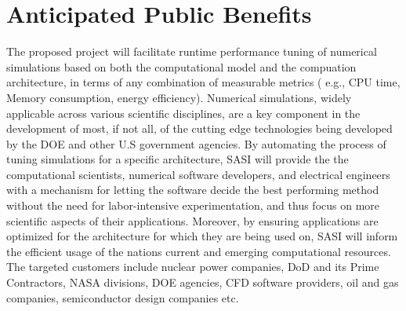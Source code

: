 \section{Anticipated Public Benefits}

The proposed project will facilitate runtime performance tuning of numerical simulations based on 
both the computational model and the compuation architecture, in terms of any combination of measurable metrics ( 
e.g., CPU time, Memory consumption, energy efficiency). Numerical simulations, widely applicable across various scientific 
disciplines, are a key component in the development of most, if not all, of the cutting edge technologies being developed 
by the DOE and other U.S government agencies. By automating the process of tuning simulations for a specific architecture, 
SASI will provide the the computational scientists, numerical software developers, and 
electrical engineers with a mechanism for letting the software decide the best performing 
method without the need for labor-intensive experimentation, and thus focus on more 
scientific aspects of their applications. Moreover, by ensuring applications are optimized for the architecture
for which they are being used on, SASI will inform the efficient usage of the nations current and emerging computational 
resources. The targeted customers include nuclear power companies, DoD and its Prime Contractors, 
NASA divisions, DOE agencies, CFD software providers, oil and gas companies, semiconductor 
design companies etc.


